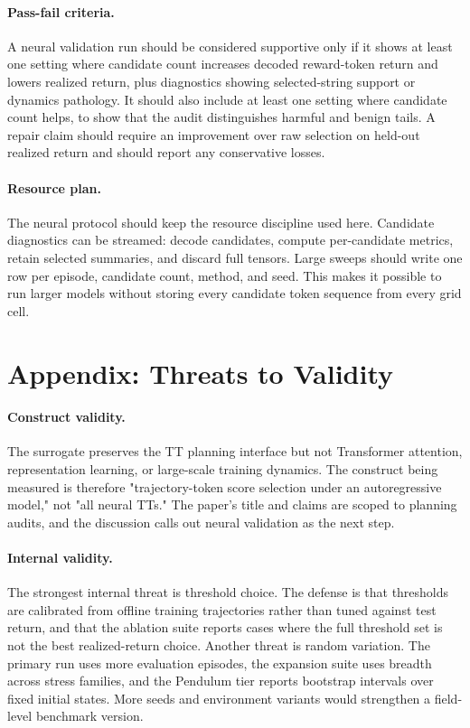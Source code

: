 \documentclass{article}
\begin{document}
\paragraph{Pass-fail criteria.}
A neural validation run should be considered supportive only if it shows at least one setting where candidate count increases decoded reward-token return and lowers realized return, plus diagnostics showing selected-string support or dynamics pathology. It should also include at least one setting where candidate count helps, to show that the audit distinguishes harmful and benign tails. A repair claim should require an improvement over raw selection on held-out realized return and should report any conservative losses.

\paragraph{Resource plan.}
The neural protocol should keep the resource discipline used here. Candidate diagnostics can be streamed: decode candidates, compute per-candidate metrics, retain selected summaries, and discard full tensors. Large sweeps should write one row per episode, candidate count, method, and seed. This makes it possible to run larger models without storing every candidate token sequence from every grid cell.

\section{Appendix: Threats to Validity}

\paragraph{Construct validity.}
The surrogate preserves the TT planning interface but not Transformer attention, representation learning, or large-scale training dynamics. The construct being measured is therefore "trajectory-token score selection under an autoregressive model," not "all neural TTs." The paper's title and claims are scoped to planning audits, and the discussion calls out neural validation as the next step.

\paragraph{Internal validity.}
The strongest internal threat is threshold choice. The defense is that thresholds are calibrated from offline training trajectories rather than tuned against test return, and that the ablation suite reports cases where the full threshold set is not the best realized-return choice. Another threat is random variation. The primary run uses more evaluation episodes, the expansion suite uses breadth across stress families, and the Pendulum tier reports bootstrap intervals over fixed initial states. More seeds and environment variants would strengthen a field-level benchmark version.
\end{document}

